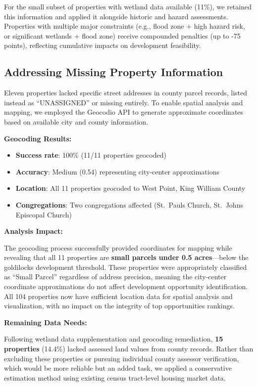 \documentclass[
  letterpaper,
  DIV=11,
  numbers=noendperiod,
  oneside]{scrreprt}
\providecommand{\tightlist}{%
  \setlength{\itemsep}{0pt}\setlength{\parskip}{0pt}}
\begin{document}
For the small subset of properties with wetland data available (11\%),
we retained this information and applied it alongside historic and
hazard assessments. Properties with multiple major constraints (e.g.,
flood zone + high hazard risk, or significant wetlands + flood zone)
receive compounded penalties (up to -75 points), reflecting cumulative
impacts on development feasibility.

\subsection{Addressing Missing Property
Information}\label{addressing-missing-property-information}

Eleven properties lacked specific street addresses in county parcel
records, listed instead as ``UNASSIGNED'' or missing entirely. To enable
spatial analysis and mapping, we employed the Geocodio API to generate
approximate coordinates based on available city and county information.

\textbf{Geocoding Results:}

\begin{itemize}
\tightlist
\item
  \textbf{Success rate}: 100\% (11/11 properties geocoded)
\item
  \textbf{Accuracy}: Medium (0.54) representing city-center
  approximations
\item
  \textbf{Location}: All 11 properties geocoded to West Point, King
  William County
\item
  \textbf{Congregations}: Two congregations affected (St.~Pauls Church,
  St.~Johns Episcopal Church)
\end{itemize}

\textbf{Analysis Impact:}

The geocoding process successfully provided coordinates for mapping
while revealing that all 11 properties are \textbf{small parcels under
0.5 acres}---below the goldilocks development threshold. These
properties were appropriately classified as ``Small Parcel'' regardless
of address precision, meaning the city-center coordinate approximations
do not affect development opportunity identification. All 104 properties
now have sufficient location data for spatial analysis and
visualization, with no impact on the integrity of top opportunities
rankings.

\textbf{Remaining Data Needs:}

Following wetland data supplementation and geocoding remediation,
\textbf{15 properties} (14.4\%) lacked assessed land values from county
records. Rather than excluding these properties or pursuing individual
county assessor verification, which would be more reliable but an added
task, we applied a conservative estimation method using existing census
tract-level housing market data.
\end{document}
